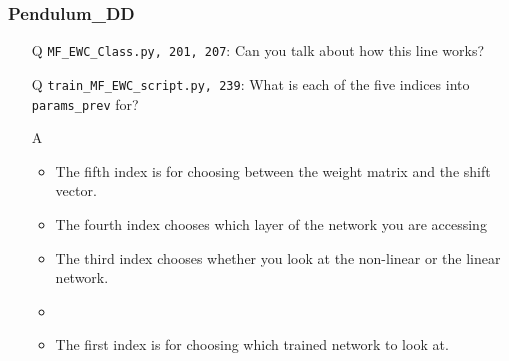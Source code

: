 \documentclass{article}
\begin{document}
\subsubsection*{Pendulum\_DD}
\begin{itemize}
	\item[Q] \verb|MF_EWC_Class.py, 201, 207|: Can you talk about how this line works?
	\item[Q] \verb|train_MF_EWC_script.py, 239|: What is each of the five indices into \verb|params_prev| for?
	\item[A]
	\begin{itemize}
		\item The fifth index is for choosing between the weight matrix and the shift vector.
		\item The fourth index chooses which layer of the network you are accessing
		\item The third index chooses whether you look at the non-linear or the linear network.
		\item 
		\item The first index is for choosing which trained network to look at.
	\end{itemize}
\end{itemize}
\end{document}
